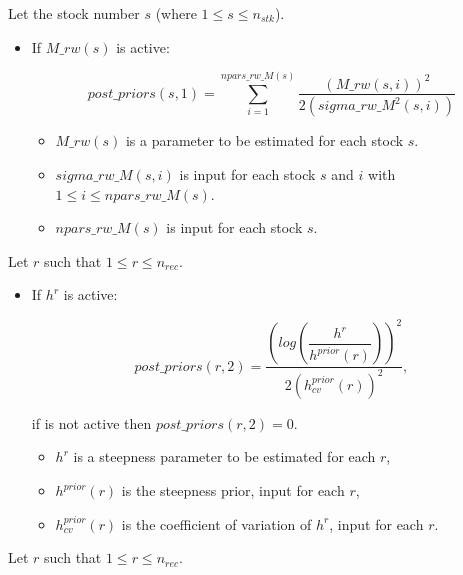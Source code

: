\documentclass{article}
\begin{document}
Let the stock number $s$ (where $1\leq s \leq n_{stk}$).

\begin{itemize}
    \item If $M\_rw(s)$ is active:
    
    \begin{equation}
        post\_priors(s,1) =  \sum_{i=1}^{npars\_rw\_M(s)}\dfrac{(M\_rw(s,i))^2}{2(sigma\_rw\_M^2(s,i))}
        \end{equation}
    \begin{itemize}
    \item $M\_rw(s)$ is a parameter to be estimated for each stock $s$. 
    
    \item $sigma\_rw\_M(s,i)$ is input for each stock $s$ and $i$ with $1\leq i \leq npars\_rw\_M(s)$.
    
    \item $npars\_rw\_M(s)$ is input for each stock $s$.
    \end{itemize}
    
    \end{itemize}

Let $r$ such that $1\leq r \leq n_{rec}$.
    
    \begin{itemize}
        \item If $h^r$ is active:
    
        \begin{equation}
            post\_priors(r,2) = \dfrac{\left(log\left(\dfrac{h^r}{h^{prior}(r)}\right)\right)^2}{2(h^{prior}_{cv}(r))^2},
        \end{equation}
        
        if is not active then $post\_priors(r,2)=0$.
        
        \begin{itemize}
            \item $h^r$ is a steepness parameter to be estimated for each $r$,
            
            \item $h^{prior}(r)$ is the steepness prior, input for each $r$,
            
            \item $h^{prior}_{cv}(r)$ is the coefficient of variation of $h^r$, input for each $r$. 
        \end{itemize}
    \end{itemize}
    
Let $r$ such that $1\leq r \leq n_{rec}$.
\end{document}
